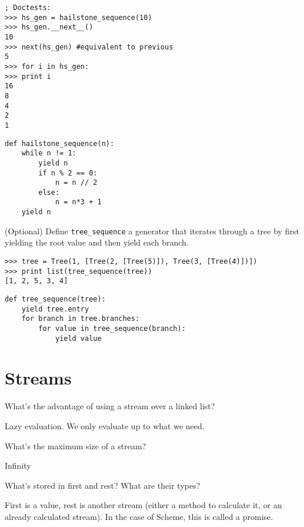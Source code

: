 \documentclass{exam}
\begin{document}
\begin{questions}
\begin{blocksection}
\begin{lstlisting}
; Doctests:
>>> hs_gen = hailstone_sequence(10)
>>> hs_gen.__next__()
10
>>> next(hs_gen) #equivalent to previous
5
>>> for i in hs_gen:
>>>	print i
16
8
4
2
1
\end{lstlisting}

\begin{solution}[1.5in]
\begin{lstlisting}
def hailstone_sequence(n):
	while n != 1:
		yield n
		if n % 2 == 0:
			n = n // 2
		else:
			n = n*3 + 1
	yield n
\end{lstlisting}
\end{solution}
\end{blocksection}

\question (Optional) Define \texttt{tree\_sequence} a generator that iterates through a tree by first yielding the root value and then yield each branch.
\begin{lstlisting}
>>> tree = Tree(1, [Tree(2, [Tree(5)]), Tree(3, [Tree(4)])])
>>> print list(tree_sequence(tree))
[1, 2, 5, 3, 4]
\end{lstlisting}

\begin{solution}[0.5in]
\begin{lstlisting}
def tree_sequence(tree):
	yield tree.entry
	for branch in tree.branches:
		for value in tree_sequence(branch):
			yield value
\end{lstlisting}
\end{solution}

\section{Streams}
\begin{blocksection}
\question What’s the advantage of using a stream over a linked list?
\begin{solution}[0.5in] 
Lazy evaluation. We only evaluate up to what we need.
\end{solution}

\question What’s the maximum size of a stream?
\begin{solution}[0.5in]
Infinity
\end{solution}

\question What’s stored in first and rest? What are their types? 
\begin{solution}[0.5in]
First is a value, rest is another stream (either a method to calculate it, or an already calculated stream). In the case of Scheme, this is called a promise.
\end{solution}


\end{blocksection}
\end{questions}
\end{document}
